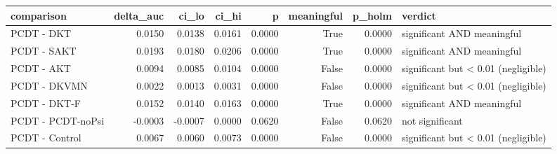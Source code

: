 \begin{tabular}{lrrrrrrl}
\toprule
comparison & delta\_auc & ci\_lo & ci\_hi & p & meaningful & p\_holm & verdict \\
\midrule
PCDT - DKT & 0.0150 & 0.0138 & 0.0161 & 0.0000 & True & 0.0000 & significant AND meaningful \\
PCDT - SAKT & 0.0193 & 0.0180 & 0.0206 & 0.0000 & True & 0.0000 & significant AND meaningful \\
PCDT - AKT & 0.0094 & 0.0085 & 0.0104 & 0.0000 & False & 0.0000 & significant but < 0.01 (negligible) \\
PCDT - DKVMN & 0.0022 & 0.0013 & 0.0031 & 0.0000 & False & 0.0000 & significant but < 0.01 (negligible) \\
PCDT - DKT-F & 0.0152 & 0.0140 & 0.0163 & 0.0000 & True & 0.0000 & significant AND meaningful \\
PCDT - PCDT-noPsi & -0.0003 & -0.0007 & 0.0000 & 0.0620 & False & 0.0620 & not significant \\
PCDT - Control & 0.0067 & 0.0060 & 0.0073 & 0.0000 & False & 0.0000 & significant but < 0.01 (negligible) \\
\bottomrule
\end{tabular}
